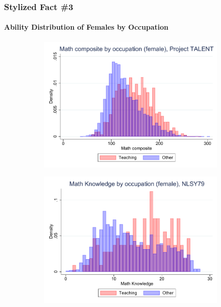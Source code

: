 \documentclass[11pt]{beamer}
\begin{document}
	
	\begin{frame}
		\frametitle{Stylized Fact \#3}
		\framesubtitle{Ability Distribution of Females by Occupation}
		\begin{adjustwidth}{2em}{2em}
			\vfill
			\begin{figure}[ht!]
				\begin{subfigure}[b]{0.27\textwidth}
					\centering
					\includegraphics[width=\textwidth]{plots/TALENT_math_occ_no_norm_female_no_lf.pdf}
				\end{subfigure}
				\hfill
				\begin{subfigure}[b]{0.27\textwidth}
					\centering
					\includegraphics[width=\textwidth]{plots/nlsy79_mk_occ_no_norm_female_no_lf.pdf}

\end{subfigure}
\end{figure}
\end{adjustwidth}
\end{frame}
\end{document}

